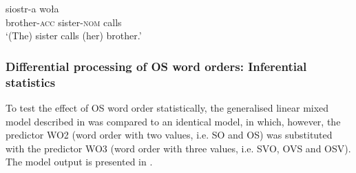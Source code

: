 \ea%
    \label{ex:05:3}
         {siostr-a}   {woła}\\
            brother-\textsc{acc}  sister-\textsc{nom}  calls\\
    \glt    `(The) sister calls (her) brother.'
    \z

\subsubsection{Differential processing of OS word orders: Inferential statistics}\label{sec:05:2.5.1}

To test the effect of OS word order statistically, the generalised linear mixed model described in  was compared to an identical model, in which, however, the predictor WO2 (word order with two values, i.e. SO and OS) was substituted with the predictor WO3 (word order with three values, i.e. SVO, OVS and OSV). The model output is presented in .

